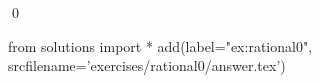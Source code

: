 
\begin{ex} \starprob
  \label{ex:rational0}
  
  \qed
\end{ex} 
\begin{python0}
from solutions import *
add(label="ex:rational0",
    srcfilename='exercises/rational0/answer.tex') 
\end{python0}
